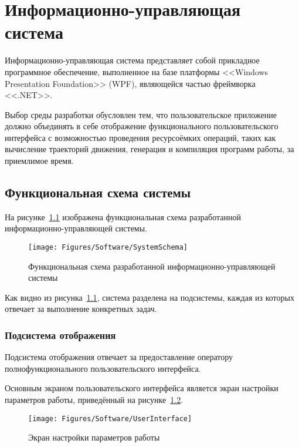 \chapter{Информационно-управляющая система}
Информационно-управляющая система представляет собой прикладное программное обеспечение, выполненное на базе платформы <<Windows Presentation Foundation>> (WPF), являющейся частью фреймворка <<.NET>>.

Выбор среды разработки обусловлен тем, что пользовательское приложение должно объединять в себе отображение функционального пользовательского интерфейса с возможностью проведения ресурсоёмких операций, таких как вычисление траекторий движения, генерация и компиляция программ работы, за приемлимое время.


\section{Функциональная схема системы}
На рисунке~\ref{fig:Software:SystemSchema} изображена функциональная схема разработанной информационно-управляющей системы.

\begin{figure}[H]
    \centering
    \vspace{14pt}
    \texttt{[image: Figures/Software/SystemSchema]}
    \caption{Функциональная схема разработанной информационно-управляющей системы}
    \label{fig:Software:SystemSchema}
\end{figure}

Как видно из рисунка~\ref{fig:Software:SystemSchema}, система разделена на подсистемы, каждая из которых отвечает за выполнение конкретных задач.

\subsection{Подсистема отображения}
Подсистема отображения отвечает за предоставление оператору полнофункционального пользовательского интерфейса.

Основным экраном пользовательского интерфейса является экран настройки параметров работы, приведённый на рисунке~\ref{fig:Software:UserInterface}.

\begin{figure}[H]
    \centering
    \vspace{14pt}
    \texttt{[image: Figures/Software/UserInterface]}
    \caption{Экран настройки параметров работы}
    \label{fig:Software:UserInterface}
\end{figure}

